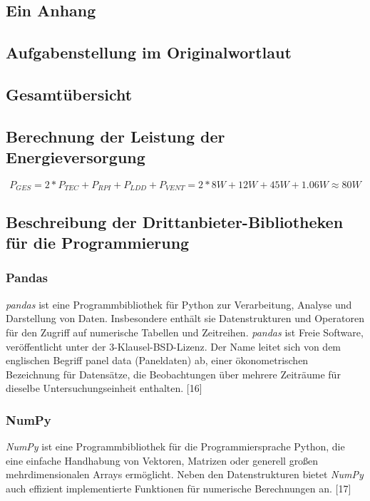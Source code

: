 \begin{appendix} %
\section{Ein Anhang}


\subsection{Aufgabenstellung im Originalwortlaut}


\subsection{Gesamtübersicht}

\subsection{Berechnung der Leistung der Energieversorgung}
\begin{equation}
P_{GES} = 2*P_{TEC}+P_{RPI}+P_{LDD}+P_{VENT} = 2*8W+12W+45W+1.06W \approx 80W
    \label{formula:_calculation_sp_power}
\end{equation}

\subsection{Beschreibung der Drittanbieter-Bibliotheken für die Programmierung}
\subsubsection{Pandas}
\textit{pandas} ist eine Programmbibliothek für Python zur Verarbeitung, Analyse und Darstellung von Daten. Insbesondere enthält sie Datenstrukturen und Operatoren für den Zugriff auf numerische Tabellen und Zeitreihen. \textit{pandas} ist Freie Software, veröffentlicht unter der 3-Klausel-BSD-Lizenz. Der Name leitet sich von dem englischen Begriff panel data (Paneldaten) ab, einer ökonometrischen Bezeichnung für Datensätze, die Beobachtungen über mehrere Zeiträume für dieselbe Untersuchungseinheit enthalten. [16]

\subsubsection{NumPy}
\textit{NumPy} ist eine Programmbibliothek für die Programmiersprache Python, die eine einfache Handhabung von Vektoren, Matrizen oder generell großen mehrdimensionalen Arrays ermöglicht. Neben den Datenstrukturen bietet \textit{NumPy} auch effizient implementierte Funktionen für numerische Berechnungen an. [17]


\end{appendix}
